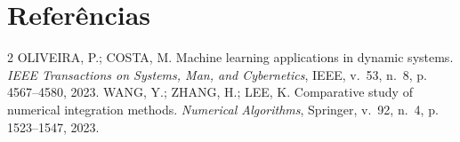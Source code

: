 \documentclass[11pt,a4paper]{article}
\begin{document}
\newpage
\section*{Referências}
{}
\begin{thebibliography}{2}
OLIVEIRA, P.; COSTA, M. Machine learning applications in dynamic systems.
\emph{IEEE Transactions on Systems, Man, and Cybernetics}, IEEE, v.~53, n.~8,
  p. 4567--4580, 2023.
WANG, Y.; ZHANG, H.; LEE, K. Comparative study of numerical integration methods.
\emph{Numerical Algorithms}, Springer, v.~92, n.~4, p. 1523--1547, 2023.
\end{thebibliography}
\end{document}
